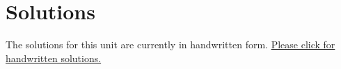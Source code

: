 
\section{Solutions}

The solutions for this unit are currently in handwritten form.
\href{http://ilearn.byui.edu/bbcswebdav/institution/Physical\_Sci\_Eng/Mathematics/Personal\%20Folders/WoodruffB/341/6-Jordan-Form-Preparation-Solutions.pdf}{Please click for handwritten solutions.}

%
%
%
